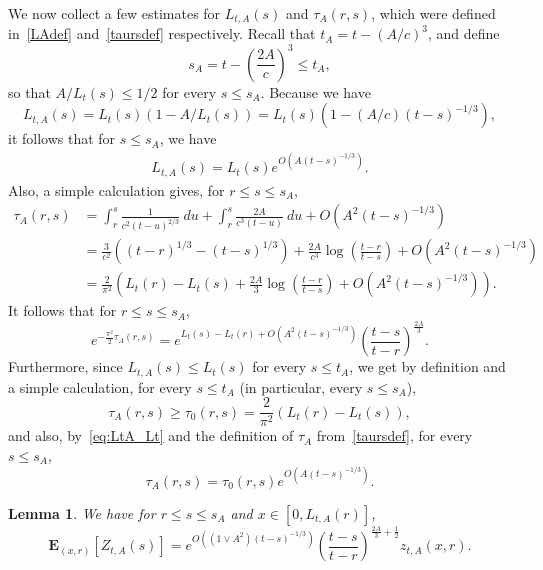 \documentclass[10pt]{amsart}
\newtheorem{lemm}[theo]{Lemma}\newtheorem{prop}[theo]{Proposition}\newtheorem{coro}[theo]{Corollary}\newtheorem{conj}[theo]{Conjecture}
\theoremstyle{definition}\newtheorem{defi}[theo]{Definition}\newtheorem{rema}[theo]{Remark}\newtheorem{exam}[theo]{Example}\newtheorem{exem}[theo]{Example}\newtheorem{nota}[theo]{Notation}
\newcommand*\E{\mathbf{E}}
\newcommand{\1} {\mathds{1}}
\begin{document}
We now collect a few estimates for $L_{t,A}(s)$ and $\tau_A(r,s)$, which were defined in~\eqref{LAdef} and~\eqref{taursdef} respectively. Recall that $t_A = t - (A/c)^3$, and define
\[
s_A = t - \left(\frac{2A}{c}\right)^3 \le t_A,
\]
so that $A/L_t(s) \le 1/2$ for every $s\le s_A$. Because we have
\[
L_{t,A}(s) = L_t(s)(1 - A/L_t(s)) = L_t(s)\left(1 - (A/c)(t - s)^{-1/3}\right),
\]
it follows that for $s\le s_A$, we have
\begin{align}\label{eq:LtA_Lt}
L_{t,A}(s) = L_t(s)e^{O\left(A(t-s)^{-1/3}\right)}.
\end{align}
Also, a simple calculation gives, for $r\le s\le s_A$,
\begin{equation}\label{tauasym}
\begin{split}
\tau_A(r, s) &= \int_r^s \frac{1}{c^2 (t - u)^{2/3}} \: du + \int_r^s \frac{2A}{c^3 (t - u)} \: du + O\left(A^2(t - s)^{-1/3}\right) \\
&= \frac{3}{c^2} \left((t - r)^{1/3} - (t - s)^{1/3} \right) + \frac{2A}{c^3} \log \left(\frac{t - r}{t-s} \right) + O\left(A^2(t - s)^{-1/3}\right)\\
&= \frac 2 {\pi^2} \left(L_t(r) - L_t(s) + \frac {2 A}{3} \log \left(\frac{t - r}{t-s} \right) + O\left(A^2(t - s)^{-1/3}\right)\right).
\end{split}
\end{equation}
It follows that for $r\le s\le s_A$,
\begin{equation}\label{tauLexpasym}
e^{-\frac{\pi^2}2\tau_A(r,s)} = e^{L_t(s) - L_t(r) + O\left(A^2(t - s)^{-1/3}\right)} \left(\frac{t - s}{t-r} \right)^{\frac{2A} 3}.
\end{equation}
Furthermore, since $L_{t,A}(s) \le L_t(s)$ for every $s\le t_A$, we get by definition and a simple calculation, for every $s\le t_A$ (in particular, every $s\le s_A$),
\begin{equation}\label{taucomparison}
\tau_A(r,s) \ge \tau_0(r,s) = \frac 2 {\pi^2} \left(L_t(r) - L_t(s)\right),
\end{equation}
and also, by~\eqref{eq:LtA_Lt} and the definition of $\tau_A$ from~\eqref{taursdef}, for every $s\le s_A$,
\begin{equation}\label{taucomparisonweak}
\tau_A(r,s) = \tau_0(r,s)e^{O\left(A(t-s)^{-1/3}\right)}.
\end{equation}

\begin{lemm}
We have for $r\le s\le s_A$ and $x\in [0,L_{t,A}(r)]$,\label{lem:Zexp}
\[
\E_{(x,r)}\left[Z_{t,A}(s)\right] = e^{O\left(\left(1 \vee A^2\right)(t - s)^{-1/3}\right)} \left(\frac{t-s}{t-r}\right)^{\frac{2A} 3 + \frac 1 2} z_{t,A}(x,r).
\]
\end{lemm}
\end{document}
